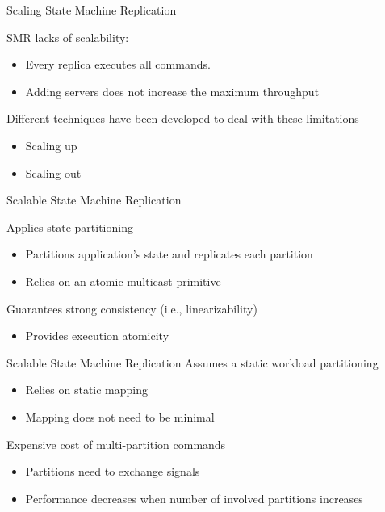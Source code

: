 \documentclass[10pt]{beamer}
\begin{document}
\begin{frame}[fragile]{Scaling State Machine Replication}

  SMR lacks of scalability:
  \begin{itemize}
    \item Every replica executes all commands.
    \item Adding servers does not increase the maximum throughput
  \end{itemize}
  
  Different techniques have been developed to deal with these limitations
  \begin{itemize}
    \item Scaling up
    \item Scaling out
  \end{itemize}

\end{frame}

\begin{frame}[fragile]{Scalable State Machine Replication}

  Applies state partitioning
  \begin{itemize}
    \item Partitions application's state and replicates each partition
    \item Relies on an atomic multicast primitive %
  \end{itemize}

  Guarantees strong consistency (i.e., linearizability)
  \begin{itemize}
    \item Provides execution atomicity
  \end{itemize}

  
\end{frame}

\begin{frame}[fragile]{Scalable State Machine Replication}
  Assumes a static workload partitioning
  \begin{itemize}
    \item Relies on static mapping
    \item Mapping does not need to be minimal
  \end{itemize}
  Expensive cost of multi-partition commands
  \begin{itemize}
    \item Partitions need to exchange signals
    \item Performance decreases when number of involved partitions increases
  \end{itemize}
  
\end{frame}
\end{document}
